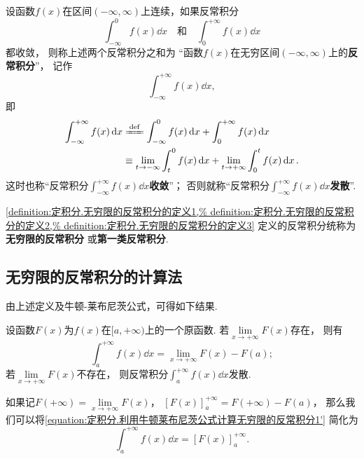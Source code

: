 \begin{definition}\label{definition:定积分.无穷限的反常积分的定义3}
设函数\(f(x)\)在区间\((-\infty,\infty)\)上连续，如果反常积分\[
\int_{-\infty}^0 f(x) \dd{x}
\quad\text{和}\quad
\int_0^{+\infty} f(x) \dd{x}
\]都收敛，%
则称上述两个反常积分之和为%
“函数\(f(x)\)在无穷区间\((-\infty,\infty)\)上的\textbf{反常积分}”，%
记作\[
\int_{-\infty}^{+\infty} f(x) \dd{x},
\]
即
\begin{equation}
\begin{split}
\int_{-\infty}^{+\infty} f(x) \dd{x}
&\defeq \int_{-\infty}^0 f(x) \dd{x} + \int_0^{+\infty} f(x) \dd{x} \\
&\equiv \lim\limits_{t \to -\infty} \int_t^0 f(x) \dd{x}
	+ \lim\limits_{t \to +\infty} \int_0^t f(x) \dd{x}.
\end{split}
\end{equation}
这时也称“反常积分\(\int_{-\infty}^{+\infty} f(x) \dd{x}\)\textbf{收敛}”；
否则就称“反常积分\(\int_{-\infty}^{+\infty} f(x) \dd{x}\)\textbf{发散}”.
\end{definition}

\cref{definition:定积分.无穷限的反常积分的定义1,%
definition:定积分.无穷限的反常积分的定义2,%
definition:定积分.无穷限的反常积分的定义3}
定义的反常积分统称为\textbf{无穷限的反常积分}%
或\textbf{第一类反常积分}.

\subsection{无穷限的反常积分的计算法}
由上述定义及牛顿-莱布尼茨公式，可得如下结果.
\begin{theorem}\label{theorem:定积分.利用牛顿莱布尼茨公式计算无穷限的反常积分1}
设函数\(F(x)\)为\(f(x)\)在\([a,+\infty)\)上的一个原函数.
若\(\lim\limits_{x \to +\infty} F(x)\)存在，%
则有
\begin{equation}\label{equation:定积分.利用牛顿莱布尼茨公式计算无穷限的反常积分1'}
\int_a^{+\infty} f(x) \dd{x}
=
\lim\limits_{x \to +\infty} F(x) - F(a);
\end{equation}
若\(\lim\limits_{x\to+\infty} F(x)\)不存在，%
则反常积分\(\int_a^{+\infty} f(x) \dd{x}\)发散.
\end{theorem}

如果记\(F(+\infty)=\lim\limits_{x \to +\infty} F(x)\)，%
\([F(x)]_a^{+\infty} = F(+\infty) - F(a)\)，%
那么我们可以将\cref{equation:定积分.利用牛顿莱布尼茨公式计算无穷限的反常积分1'} 简化为
\begin{equation}\label{equation:定积分.利用牛顿莱布尼茨公式计算无穷限的反常积分1}
\int_a^{+\infty} f(x) \dd{x} = [F(x)]_a^{+\infty}.
\end{equation}

